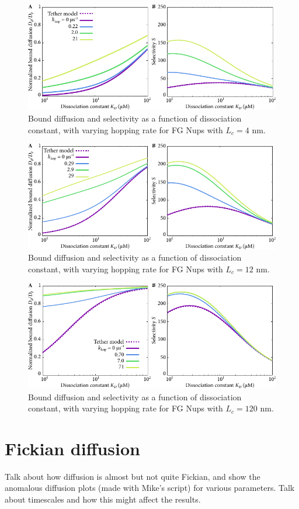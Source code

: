\begin{figure}[h]
\centering
\includegraphics[width=0.7\linewidth]{figs/ch02/hopping_lc4-fig.pdf}
\caption{Bound diffusion and selectivity as a function of dissociation
  constant, with varying hopping rate for FG Nups with $L_c = 4$ nm.}
\label{fig:partitioningB}
\end{figure}
\begin{figure}[h]
\centering
\includegraphics[width=0.7\linewidth]{figs/ch02/hopping_lc12-fig.pdf}
\caption{Bound diffusion and selectivity as a function of dissociation
  constant, with varying hopping rate for FG Nups with $L_c = 12$ nm.}
\label{fig:partitioningC}
\end{figure}
\begin{figure}[h]
\centering
\includegraphics[width=0.7\linewidth]{figs/ch02/hopping_lc120-fig.pdf}
\caption{Bound diffusion and selectivity as a function of dissociation
  constant, with varying hopping rate for FG Nups with $L_c = 120$ nm.}
\label{fig:partitioningD}
\end{figure}


\section{Fickian diffusion}
\label{sec:fickian}
Talk about how diffusion is almost but not quite Fickian, and show the anomalous diffusion plots (made with Mike's script) for various parameters. Talk about timescales and how this might affect the results.

